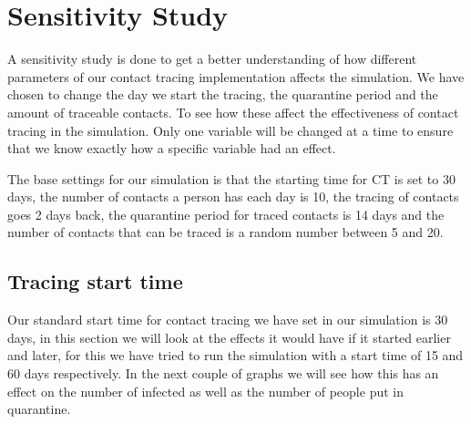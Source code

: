 \section{Sensitivity Study}
A sensitivity study is done to get a better understanding of how different parameters of our contact tracing implementation affects the simulation. We have chosen to change the day we start the tracing, the quarantine period and the amount of traceable contacts. To see how these affect the effectiveness of contact tracing in the simulation. Only one variable will be changed at a time to ensure that we know exactly how a specific variable had an effect.

The base settings for our simulation is that the starting time for CT is set to 30 days, the number of contacts a person has each day is 10, the tracing of contacts goes 2 days back, the quarantine period for traced contacts is 14 days and the number of contacts that can be traced is a random number between 5 and 20. 

\subsection{Tracing start time}
Our standard start time for contact tracing we have set in our simulation is 30 days, in this section we will look at the effects it would have if it started earlier and later, for this we have tried to run the simulation with a start time of 15 and 60 days respectively. In the next couple of graphs we will see how this has an effect on the number of infected as well as the number of people put in quarantine.

